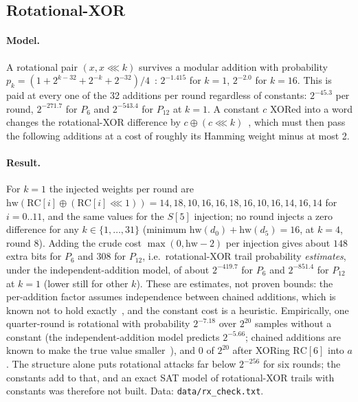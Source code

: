 \documentclass{iacrtrans}
\newcommand{\PP}[1]{P_{#1}}
\newcommand{\rotl}{\lll}
\begin{document}
\subsection{Rotational-XOR}
\label{sec:rx}
\paragraph{Model.} A rotational pair $(x, x\rotl k)$ survives a modular addition with probability $p_k = (1 + 2^{k-32} + 2^{-k} + 2^{-32})/4$~\cite{KN10}: $2^{-1.415}$ for $k = 1$, $2^{-2.0}$ for $k = 16$. This is paid at every one of the 32 additions per round regardless of constants: $2^{-45.3}$ per round, $2^{-271.7}$ for $\PP{6}$ and $2^{-543.4}$ for $\PP{12}$ at $k = 1$. A constant $c$ XORed into a word changes the rotational-XOR difference by $c \oplus (c\rotl k)$~\cite{AL16}, which must then pass the following additions at a cost of roughly its Hamming weight minus at most 2.

\paragraph{Result.} For $k = 1$ the injected weights per round are $\mathrm{hw}(\mathrm{RC}[i]\oplus(\mathrm{RC}[i]\rotl 1)) = 14, 18, 10, 16, 16, 18, 16, 10, 16, 14, 16, 14$ for $i = 0..11$, and the same values for the $S[5]$ injection; no round injects a zero difference for any $k \in \{1,\ldots,31\}$ (minimum $\mathrm{hw}(d_0)+\mathrm{hw}(d_5) = 16$, at $k = 4$, round 8). Adding the crude cost $\max(0,\mathrm{hw}-2)$ per injection gives about $148$ extra bits for $\PP{6}$ and $308$ for $\PP{12}$, i.e.\ rotational-XOR trail probability \emph{estimates}, under the independent-addition model, of about $2^{-419.7}$ for $\PP{6}$ and $2^{-851.4}$ for $\PP{12}$ at $k = 1$ (lower still for other $k$). These are estimates, not proven bounds: the per-addition factor assumes independence between chained additions, which is known not to hold exactly~\cite{KNPSS15}, and the constant cost is a heuristic. Empirically, one quarter-round is rotational with probability $2^{-7.18}$ over $2^{20}$ samples without a constant (the independent-addition model predicts $2^{-5.66}$; chained additions are known to make the true value smaller~\cite{KNPSS15}), and $0$ of $2^{20}$ after XORing $\mathrm{RC}[6]$ into $a$. The structure alone puts rotational attacks far below $2^{-256}$ for six rounds; the constants add to that, and an exact SAT model of rotational-XOR trails with constants was therefore not built. Data: \texttt{data/rx\_check.txt}.
\end{document}
